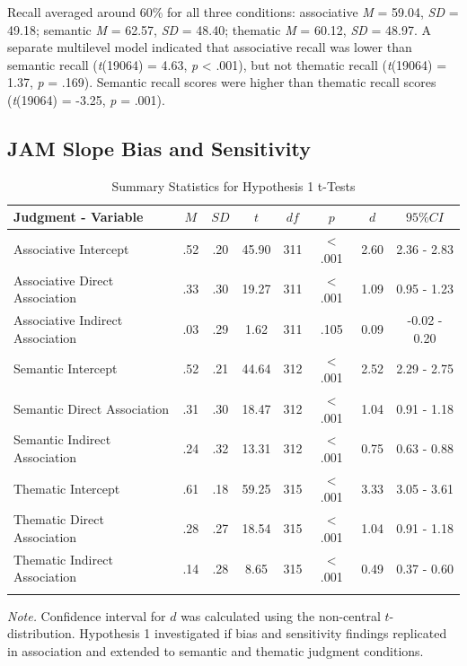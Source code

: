 \documentclass[english,,man]{apa6}
\begin{document}
Recall averaged around 60\% for all three conditions: associative \emph{M} = 59.04, \emph{SD} = 49.18; semantic \emph{M} = 62.57, \emph{SD} = 48.40; thematic \emph{M} = 60.12, \emph{SD} = 48.97. A separate multilevel model indicated that associative recall was lower than semantic recall (\emph{t}(19064) = 4.63, \emph{p} \textless{} .001), but not thematic recall (\emph{t}(19064) = 1.37, \emph{p} = .169). Semantic recall scores were higher than thematic recall scores (\emph{t}(19064) = -3.25, \emph{p} = .001).

\hypertarget{jam-slope-bias-and-sensitivity}{%
\subsection{JAM Slope Bias and Sensitivity}\label{jam-slope-bias-and-sensitivity}}

\begin{table}[tbp]
\begin{center}
\begin{threeparttable}
\caption{\label{tab:hyp1-table1}Summary Statistics for Hypothesis 1 t-Tests}
\begin{tabular}{lccccccc}
\toprule
Judgment - Variable & $M$ & $SD$ & $t$ & $df$ & $p$ & $d$ & $95\% CI$\\
\midrule
Associative Intercept & .52 & .20 & 45.90 & 311 & < .001 & 2.60 & 2.36 - 2.83\\
Associative Direct Association & .33 & .30 & 19.27 & 311 & < .001 & 1.09 & 0.95 - 1.23\\
Associative Indirect Association & .03 & .29 & 1.62 & 311 & .105 & 0.09 & -0.02 - 0.20\\
Semantic Intercept & .52 & .21 & 44.64 & 312 & < .001 & 2.52 & 2.29 - 2.75\\
Semantic Direct Association & .31 & .30 & 18.47 & 312 & < .001 & 1.04 & 0.91 - 1.18\\
Semantic Indirect Association & .24 & .32 & 13.31 & 312 & < .001 & 0.75 & 0.63 - 0.88\\
Thematic Intercept & .61 & .18 & 59.25 & 315 & < .001 & 3.33 & 3.05 - 3.61\\
Thematic Direct Association & .28 & .27 & 18.54 & 315 & < .001 & 1.04 & 0.91 - 1.18\\
Thematic Indirect Association & .14 & .28 & 8.65 & 315 & < .001 & 0.49 & 0.37 - 0.60\\
\bottomrule
\addlinespace
\end{tabular}
\begin{tablenotes}[para]
\normalsize{\textit{Note.} Confidence interval for $d$ was calculated using the non-central $t$-distribution. Hypothesis 1 investigated if bias and sensitivity findings replicated in association and extended to semantic and thematic judgment conditions.}
\end{tablenotes}
\end{threeparttable}
\end{center}
\end{table}
\end{document}
